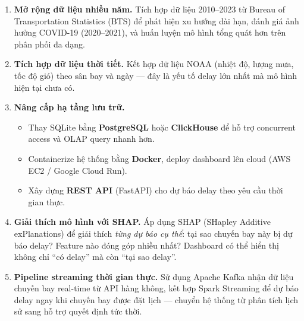 \begin{enumerate}
    \item \textbf{Mở rộng dữ liệu nhiều năm.}
    Tích hợp dữ liệu 2010--2023 từ Bureau of Transportation Statistics (BTS)
    để phát hiện xu hướng dài hạn, đánh giá ảnh hưởng COVID-19 (2020--2021),
    và huấn luyện mô hình tổng quát hơn trên phân phối đa dạng.

    \item \textbf{Tích hợp dữ liệu thời tiết.}
    Kết hợp dữ liệu NOAA (nhiệt độ, lượng mưa, tốc độ gió)
    theo sân bay và ngày --- đây là yếu tố delay lớn nhất
    mà mô hình hiện tại chưa có.

    \item \textbf{Nâng cấp hạ tầng lưu trữ.}
    \begin{itemize}
        \item Thay SQLite bằng \textbf{PostgreSQL} hoặc \textbf{ClickHouse}
              để hỗ trợ concurrent access và OLAP query nhanh hơn.
        \item Containerize hệ thống bằng \textbf{Docker},
              deploy dashboard lên cloud (AWS EC2 / Google Cloud Run).
        \item Xây dựng \textbf{REST API} (FastAPI) cho dự báo delay
              theo yêu cầu thời gian thực.
    \end{itemize}

    \item \textbf{Giải thích mô hình với SHAP.}
    Áp dụng SHAP (SHapley Additive exPlanations) \cite{lundberg2017shap}
    để giải thích \textit{từng dự báo cụ thể}:
    tại sao chuyến bay này bị dự báo delay? Feature nào đóng góp nhiều nhất?
    Dashboard có thể hiển thị không chỉ ``có delay'' mà còn ``tại sao delay''.

    \item \textbf{Pipeline streaming thời gian thực.}
    Sử dụng Apache Kafka nhận dữ liệu chuyến bay real-time từ API hàng không,
    kết hợp Spark Streaming để dự báo delay ngay khi chuyến bay được đặt lịch ---
    chuyển hệ thống từ phân tích lịch sử sang hỗ trợ quyết định tức thời.
\end{enumerate}

